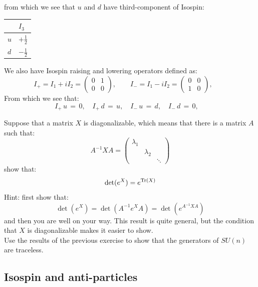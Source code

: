 \documentclass[12pt]{article}
\begin{document}
from which we see that $u$ and $d$ have third-component of Isospin:\\
\begin{center}
\begin{tabular}{ll}
\hline
  & $I_3$ \\
\hline
$u$ & $+\frac{1}{2}$ \\
$d$ & $-\frac{1}{2}$ \\
\hline
\end{tabular}
\end{center}
We also have Isospin raising and lowering operators defined as:
\begin{equation*}
  I_+ = I_1 + i I_2 = \begin{pmatrix} 0 & 1 \\ 0 & 0 \end{pmatrix}, \qquad
  I_- = I_1 - i I_2 = \begin{pmatrix} 0 & 0 \\ 1 & 0 \end{pmatrix}, \qquad
\end{equation*}
From which we see that:
$$I_+ \, u \, = \, 0, \quad I_+ \, d \, = \, u, \quad 
I_- \, u \, = \, d, \quad I_- \, d \, = \, 0, \quad$$

\exercise Suppose that a matrix $X$ is diagonalizable, which means
that there is a matrix $A$ such that:
$$A^{-1} X A = \begin{pmatrix} \lambda_1 & & \\ & \lambda_2 & \\ & & \ddots \end{pmatrix}$$
show that:
$$ \det(e^X) = e^{{\rm Tr}(X)}$$
Hint: first show that:
$$\det(e^X) = \det(A^{-1} e^X A) = \det(e^{A^{-1} X A})$$
and then you are well on your way.  This result is quite general, but
the condition that $X$ is diagonalizable makes it easier to show.\\[5pt]

\exercise Use the results of the previous exercise to show that
the generators of $SU(n)$ are traceless.

\subsection{Isospin and anti-particles}
\end{document}
